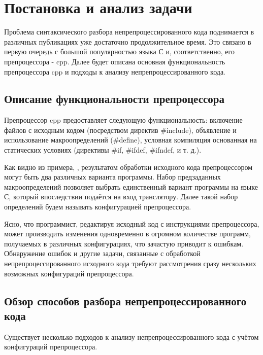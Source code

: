 \clearpage

\section{Постановка и анализ задачи}

Проблема синтаксического разбора непрепроцессированного кода поднимается в различных публикациях уже достаточно продолжительное время. Это связано в первую очередь с большой популярностью языка С и, соответственно, его препроцессора - cpp. Далее будет описана основная функциональность препроцессора cpp и подходы к анализу непрепроцессированного кода.

\subsection{Описание функциональности препроцессора}

Препроцессор cpp предоставляет следующую функциональность: включение файлов с исходным кодом (посредством директив \#include), объявление и использование макроопределений (\#define), условная компиляция основанная на статических условиях (директивы \#if, \#ifdef, \#ifndef, и т. д.).


Как видно из примера, , результатом обработки исходного кода препроцессором могут быть два различных варианта программы. Набор предзаданных макроопределений позволяет выбрать единственный вариант программы на языке С, который впоследствии подаётся на вход транслятору. Далее такой набор определений будем называть конфигурацией препроцессора.

Ясно, что программист, редактируя исходный код с инструкциями препроцессора, может производить изменения одновременно в огромном количестве программ, получаемых в различных конфигурациях, что зачастую приводит к ошибкам\cite{ribeiro}. Обнаружение ошибок и другие задачи, связанные с обработкой непрепроцессированного исходного кода требуют рассмотрения сразу нескольких возможных конфигураций препроцессора.

\subsection{Обзор способов разбора непрепроцессированного кода}
\label{subsec:unpreprocessed_parsing_methods}

Существует несколько подходов к анализу непрепроцессированного кода с учётом конфигураций препроцессора.

